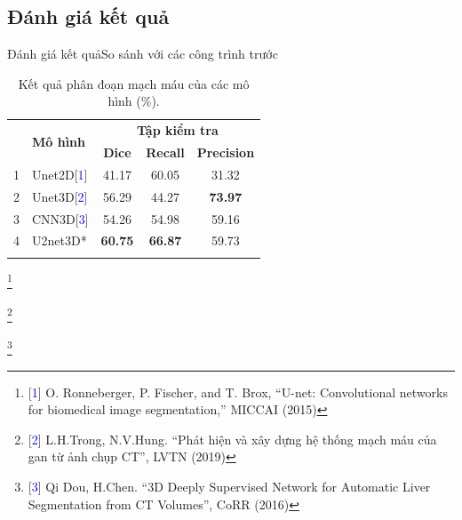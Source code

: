 \documentclass[
	10pt,                %
	aspectratio=169,     %
]{beamer}
\begin{document}
\subsection{Đánh giá kết quả}
    \begin{frame}{Đánh giá kết quả}{So sánh với các công trình trước}
        \begin{table}[H]
        \renewcommand{\arraystretch}{1.1}
        \centering
        \begin{tabular}{c l c c c}
            \Xhline{2\arrayrulewidth}
            \multirow{2}{*}{\textbf{STT}} & \multirow{2}{*}{\textbf{Mô hình}} & \multicolumn{3}{c}{\textbf{Tập kiểm tra}} \\ \cline{3-5}
            & &  \textbf{Dice} & \textbf{Recall} & \textbf{Precision} \\ 
            \Xhline{2\arrayrulewidth}
            1   & Unet2D\small[\textcolor{blue}{1}]       & 41.17 & 60.05 & 31.32\\
            2   & Unet3D\small[\textcolor{blue}{2}]       & 56.29 & 44.27 & \textbf{73.97} \\
            3   & CNN3D\small[\textcolor{blue}{3}]        & 54.26 & 54.98 & 59.16 \\
            4   & U2net3D*     & \textbf{60.75} & \textbf{66.87} & 59.73 \\
            \Xhline{2\arrayrulewidth}
        \end{tabular}
        \caption{Kết quả phân đoạn mạch máu của các mô hình (\%).}
        \end{table}
        
    \vspace{-8mm}\let\thefootnote\relax\footnote{\hspace{-6mm}\scriptsize [\textcolor{blue}{1}] O. Ronneberger, P. Fischer, and T. Brox, “U-net: Convolutional networks for biomedical image segmentation,” MICCAI (2015)}
        
    \vspace{-8mm}\let\thefootnote\relax\footnote{\hspace{-6mm}\scriptsize [\textcolor{blue}{2}] L.H.Trong, N.V.Hung. “Phát hiện và xây dựng hệ thống mạch máu của gan từ ảnh chụp CT”, LVTN (2019)}
    
    \vspace{-8mm}\let\thefootnote\relax\footnote{\hspace{-6mm}\scriptsize [\textcolor{blue}{3}] Qi Dou, H.Chen. “3D Deeply Supervised Network for Automatic Liver Segmentation from CT Volumes”, CoRR (2016)}
    \end{frame}
    
\end{document}
